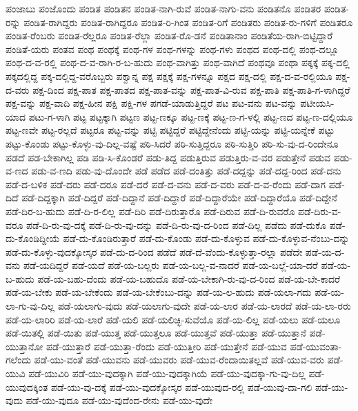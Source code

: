 ಪಂಜಾಬು
ಪಂಜೊಂದು
ಪಂಡಿತ
ಪಂಡಿತನ
ಪಂಡಿತ-ನಾಗಿ-ರುವೆ
ಪಂಡಿತ-ನಾಗು-ವನು
ಪಂಡಿತನೊ
ಪಂಡಿತರ
ಪಂಡಿತ-ರನ್ನು
ಪಂಡಿತ-ರಾಗಿದ್ದರು
ಪಂಡಿತ-ರಾಗಿದ್ದರೂ
ಪಂಡಿತ-ರಿ-ಗಿಂತ
ಪಂಡಿತ-ರಿಗೆ
ಪಂಡಿತರು
ಪಂಡಿತ-ರು-ಗಳಿಗೆ
ಪಂಡಿತರೂ
ಪಂಡಿತ-ರೆಂಬರು
ಪಂಡಿತ-ರೆಲ್ಲರೂ
ಪಂಡಿತ-ರೆಲ್ಲಾ
ಪಂಡಿತ-ರೊ-ಡನೆ
ಪಂಡಿತಾನಾಂ
ಪಂಡಿತೆಯ-ರಾಗಿ-ಬಿಟ್ಟಿದ್ದಾರೆ
ಪಂಡಿತೆ-ಯರು
ಪಂತವ
ಪಂಥ
ಪಂಥಕ್ಕೆ
ಪಂಥ-ಗಳ
ಪಂಥ-ಗಳನ್ನು
ಪಂಥ-ಗಳು
ಪಂಥದ
ಪಂಥ-ದಲ್ಲಿ
ಪಂಥ-ದಲ್ಲೂ
ಪಂಥ-ದ-ವ-ರಲ್ಲಿ
ಪಂಥ-ದ-ವ-ರಾಗಿ-ರ-ಬ-ಹುದು
ಪಂಥ-ವಾಗಿತ್ತು
ಪಂಥ-ವಾಗಿದೆ
ಪಂಥವೂ
ಪಂಥಾ
ಪಕ್ಕಕ್ಕೆ
ಪಕ್ಕ-ದಲ್ಲಿ
ಪಕ್ಕದಲ್ಲಿದ್ದ
ಪಕ್ಕ-ದಲ್ಲಿದ್ದ-ವರೊಬ್ಬರು
ಪಕ್ವಾನ್ನ
ಪಕ್ಷ
ಪಕ್ಷಕ್ಕೆ
ಪಕ್ಷ-ಗಳನ್ನೂ
ಪಕ್ಷದ
ಪಕ್ಷ-ದಲ್ಲಿ
ಪಕ್ಷ-ದ-ವ-ರಲ್ಲಿಯೂ
ಪಕ್ಷ-ದ-ವರು
ಪಕ್ಷ-ದಿಂದ
ಪಕ್ಷ-ಪಾತ
ಪಕ್ಷ-ಪಾತದ
ಪಕ್ಷ-ಪಾತ-ವನ್ನು
ಪಕ್ಷ-ಪಾತ-ವಿ-ರುವ
ಪಕ್ಷ-ಪಾತಿ
ಪಕ್ಷ-ಪಾತಿ-ಗ-ಳಾಗಿದ್ದರೆ
ಪಕ್ಷ-ವನ್ನು
ಪಕ್ಷ-ವಾದಿ
ಪಕ್ಷ-ಹೀನ
ಪಕ್ಷಿ
ಪಕ್ಷಿ-ಗಳ
ಪಗಡೆ-ಯಾಡುತ್ತಿದ್ದರೆ
ಪಟ
ಪಟ-ವನು
ಪಟ-ವನ್ನು
ಪಟೀಯಸಿ-ಯಾದ
ಪಟು-ಗ-ಳಾಗಿ
ಪಟ್ಟ
ಪಟ್ಟಕ್ಕಾಗಿ
ಪಟ್ಟಣ
ಪಟ್ಟ-ಣಕ್ಕೂ
ಪಟ್ಟ-ಣಕ್ಕೆ
ಪಟ್ಟ-ಣ-ಗ-ಳಲ್ಲಿ
ಪಟ್ಟ-ಣದ
ಪಟ್ಟ-ಣ-ದಲ್ಲಿಯೂ
ಪಟ್ಟ-ಣವೇ
ಪಟ್ಟ-ರಲ್ಲದೆ
ಪಟ್ಟರೂ
ಪಟ್ಟ-ವನ್ನು
ಪಟ್ಟಿ
ಪಟ್ಟಿದ್ದರೆ
ಪಟ್ಟಿದ್ದೇನೆಂದು
ಪಟ್ಟಿ-ಯನ್ನು
ಪಟ್ಟಿ-ಯನ್ನೇಕೆ
ಪಟ್ಟು
ಪಟ್ಟು-ಕೊಂಡು
ಪಟ್ಟು-ಕೊಳ್ಳು-ವು-ದಿಲ್ಲ-ವಷ್ಟೆ
ಪಠಿ-ಸಿದರೆ
ಪಠಿ-ಸುತ್ತಿದ್ದರೂ
ಪಠಿ-ಸುತ್ತಿರಿ
ಪಠಿ-ಸು-ವು-ದ-ರಿಂದೇನೂ
ಪಡದೆ
ಪಡ-ಬೇಕಾಗಿಲ್ಲ
ಪಡಿ
ಪಡಿ-ಸಿ-ಕೊಂಡರೆ
ಪಡು-ತಿದ್ದ
ಪಡುತ್ತಿರುವ
ಪಡುತ್ತಿರು-ವ-ವರ
ಪಡುತ್ತೇನೆ
ಪಡುವ
ಪಡು-ವ-ಣದ
ಪಡು-ವ-ಣದಿ
ಪಡು-ವು-ದೊಂದೇ
ಪಡೆ
ಪಡೆದ
ಪಡೆ-ದಂತಿತ್ತು
ಪಡೆ-ದದ್ದನ್ನು
ಪಡೆ-ದದ್ದ-ರಿಂದ
ಪಡೆ-ದನು
ಪಡೆ-ದ-ಬಳಿಕ
ಪಡೆ-ದರು
ಪಡೆ-ದರೂ
ಪಡೆ-ದರೆ
ಪಡೆ-ದ-ವನು
ಪಡೆ-ದ-ವರು
ಪಡೆ-ದ-ವ-ರೆಂದು
ಪಡೆ-ದಾಗ
ಪಡೆ-ದಿದೆ
ಪಡೆ-ದಿದ್ದಕ್ಕಾಗಿ
ಪಡೆ-ದಿದ್ದರೆ
ಪಡೆ-ದಿದ್ದಾನೆ
ಪಡೆ-ದಿದ್ದಾರೆ
ಪಡೆ-ದಿದ್ದಾರೆಯೇ
ಪಡೆ-ದಿದ್ದಾರೆಯೊ
ಪಡೆ-ದಿದ್ದೇನೆ
ಪಡೆ-ದಿರ-ಬ-ಹುದು
ಪಡೆ-ದಿ-ರ-ಲಿಲ್ಲ
ಪಡೆ-ದಿರಿ
ಪಡೆ-ದಿರುತ್ತಾರೊ
ಪಡೆ-ದಿರುವ
ಪಡೆ-ದಿ-ರುವರೊ
ಪಡೆ-ದಿರು-ವ-ವರೂ
ಪಡೆ-ದಿ-ರು-ವು-ದಕ್ಕೆ
ಪಡೆ-ದಿ-ರು-ವು-ದನ್ನು
ಪಡೆ-ದಿ-ರು-ವು-ದ-ರಿಂದ
ಪಡೆ-ದಿಲ್ಲ
ಪಡೆದು
ಪಡೆ-ದುಕೊ
ಪಡೆ-ದು-ಕೊಂಡಿದ್ದೀಯೆ
ಪಡೆ-ದು-ಕೊಂಡಿರುತ್ತಾರೆ
ಪಡೆ-ದು-ಕೊಂಡು
ಪಡೆ-ದು-ಕೊಳ್ಳುವ
ಪಡೆ-ದು-ಕೊಳ್ಳುವ-ನೆಂಬು-ದನ್ನು
ಪಡೆ-ದು-ಕೊಳ್ಳು-ವುದಕ್ಕೋಸ್ಕರ
ಪಡೆ-ದು-ದ-ರಿಂದ
ಪಡೆದೆ
ಪಡೆ-ದೆ-ವೆಂದು-ಕೊಳ್ಳುತ್ತಾ-ರಲ್ಲಾ
ಪಡೆದೇ
ಪಡೆ-ಯ-ದ-ವನು
ಪಡೆ-ಯದಿದ್ದರೆ
ಪಡೆ-ಯದೆ
ಪಡೆ-ಯ-ಬಲ್ಲರು
ಪಡೆ-ಯ-ಬಲ್ಲ-ವ-ನಾದರೆ
ಪಡೆ-ಯ-ಬಲ್ಲೆ-ಯಾ-ದರೆ
ಪಡೆ-ಯ-ಬ-ಹುದು
ಪಡೆ-ಯ-ಬಹು-ದೆಂದು
ಪಡೆ-ಯ-ಬಹುದೊ
ಪಡೆ-ಯ-ಬೇಕಾಗಿ-ರು-ವು-ದ-ರಿಂದ
ಪಡೆ-ಯ-ಬೇ-ಕಾದರೆ
ಪಡೆ-ಯ-ಬೇಕು
ಪಡೆ-ಯ-ಬೇಕೆಂದು
ಪಡೆ-ಯ-ಬೇಕೆಂಬು-ದನ್ನು
ಪಡೆ-ಯ-ಲ-ಹುದು
ಪಡೆ-ಯಲಾ-ಗದು
ಪಡೆ-ಯ-ಲಾ-ಗು-ವು-ದಿಲ್ಲ
ಪಡೆ-ಯಲಾಗು-ವುದು
ಪಡೆ-ಯಲಾಗು-ವುದೇ
ಪಡೆ-ಯ-ಲಾರ
ಪಡೆ-ಯ-ಲಾರದೆ
ಪಡೆ-ಯ-ಲಾ-ರರು
ಪಡೆ-ಯ-ಲಾರಿರಿ
ಪಡೆ-ಯ-ಲಾರೆ
ಪಡೆ-ಯಲಿ
ಪಡೆ-ಯಲಿಚ್ಛಿ-ಸುವೆಯೊ
ಪಡೆ-ಯ-ಲಿಲ್ಲ
ಪಡೆ-ಯಲು
ಪಡೆ-ಯಲೂ
ಪಡೆ-ಯಿತಲ್ಲಿ
ಪಡೆ-ಯಿತು
ಪಡೆ-ಯುತ್ತ
ಪಡೆ-ಯುತ್ತಲೂ
ಪಡೆ-ಯುತ್ತವೆ
ಪಡೆ-ಯುತ್ತಾ
ಪಡೆ-ಯುತ್ತಾನೆ
ಪಡೆ-ಯುತ್ತಾನೋ
ಪಡೆ-ಯುತ್ತಾರೆ
ಪಡೆ-ಯುತ್ತಾ-ರೆಂದು
ಪಡೆ-ಯುತ್ತೀರಿ
ಪಡೆ-ಯುತ್ತೇನೆ
ಪಡೆ-ಯುವ
ಪಡೆ-ಯುವಂತಾ-ಗಲೆಂದು
ಪಡೆ-ಯು-ವಂತೆ
ಪಡೆ-ಯುವನು
ಪಡೆ-ಯುವರು
ಪಡೆ-ಯುವ-ರೆಂದಾಯಿತಲ್ಲವೆ
ಪಡೆ-ಯುವ-ವರು
ಪಡೆ-ಯುವಿ
ಪಡೆ-ಯುವಿರಿ
ಪಡೆ-ಯು-ವುದಕ್ಕಾಗಿ
ಪಡೆ-ಯು-ವುದಕ್ಕಾಗಿಯೆ
ಪಡೆ-ಯು-ವುದಕ್ಕಾ-ಗು-ವು-ದಿಲ್ಲ
ಪಡೆ-ಯುವುದಕ್ಕಿಂತ
ಪಡೆ-ಯು-ವು-ದಕ್ಕೆ
ಪಡೆ-ಯು-ವುದಕ್ಕೋಸ್ಕರ
ಪಡೆ-ಯುವುದ-ರಲ್ಲಿ
ಪಡೆ-ಯುವು-ದಾ-ಗಲಿ
ಪಡೆ-ಯು-ವುದು
ಪಡೆ-ಯು-ವುದೂ
ಪಡೆ-ಯು-ವುದೆಂದ-ರೇನು
ಪಡೆ-ಯು-ವುದೇ
